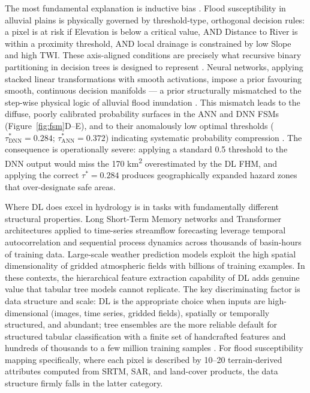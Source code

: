 \documentclass[12pt, a4paper]{article}
\begin{document}
The most fundamental explanation is inductive bias \citep{Mitchell1980}. Flood susceptibility in alluvial plains is physically governed by threshold-type, orthogonal decision rules: a pixel is at risk if Elevation is below a critical value, AND Distance to River is within a proximity threshold, AND local drainage is constrained by low Slope and high TWI. These axis-aligned conditions are precisely what recursive binary partitioning in decision trees is designed to represent \citep{breiman2001}. Neural networks, applying stacked linear transformations with smooth activations, impose a prior favouring smooth, continuous decision manifolds --- a prior structurally mismatched to the step-wise physical logic of alluvial flood inundation \citep{Popov2021}. This mismatch leads to the diffuse, poorly calibrated probability surfaces in the ANN and DNN FSMs (Figure~\ref{fig:fsm}D--E), and to their anomalously low optimal thresholds ($\tau^*_\text{DNN} = 0.284$; $\tau^*_\text{ANN} = 0.372$) indicating systematic probability compression \citep{Niculescu-Mizil2005, zadrozny2002}. The consequence is operationally severe: applying a standard 0.5 threshold to the DNN output would miss the 170 km\textsuperscript{2} overestimated by the DL FHM, and applying the correct $\tau^* = 0.284$ produces geographically expanded hazard zones that over-designate safe areas.

Where DL does excel in hydrology is in tasks with fundamentally different structural properties. Long Short-Term Memory networks and Transformer architectures applied to time-series streamflow forecasting \citep{Kratzert2018, Frame2022} leverage temporal autocorrelation and sequential process dynamics across thousands of basin-hours of training data. Large-scale weather prediction models \citep{Bi2023, Lam2023} exploit the high spatial dimensionality of gridded atmospheric fields with billions of training examples. In these contexts, the hierarchical feature extraction capability of DL adds genuine value that tabular tree models cannot replicate. The key discriminating factor is data structure and scale: DL is the appropriate choice when inputs are high-dimensional (images, time series, gridded fields), spatially or temporally structured, and abundant; tree ensembles are the more reliable default for structured tabular classification with a finite set of handcrafted features and hundreds of thousands to a few million training samples \citep{mcelfresh2023, shwartzziv2022}. For flood susceptibility mapping specifically, where each pixel is described by 10--20 terrain-derived attributes computed from SRTM, SAR, and land-cover products, the data structure firmly falls in the latter category.
\end{document}
